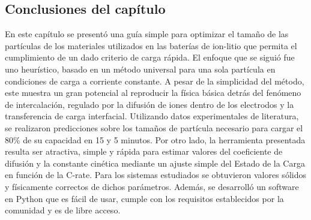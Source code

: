 \subsection{Conclusiones del capítulo}

En este capítulo se presentó una guía simple para optimizar el tamaño de las 
partículas de los materiales utilizados en las baterías de ion-litio que permita
el cumplimiento de un dado criterio de carga rápida. El enfoque que se siguió
fue uno heurístico, basado en un método universal para una sola partícula en
condiciones de carga a corriente constante. A pesar de la simplicidad del método, 
este muestra un gran potencial al reproducir la física básica detrás del 
fenómeno de intercalación, regulado por la difusión de iones dentro de los 
electrodos y la transferencia de carga interfacial. Utilizando datos 
experimentales de literatura, se realizaron predicciones sobre los tamaños de
partícula necesario para cargar el 80\% de su capacidad en 15 y 5 minutos. 
Por otro lado, la herramienta presentada resulta ser atractiva, simple y rápida 
para estimar valores del coeficiente de difusión y la constante cinética mediante
un ajuste simple del Estado de la Carga en función de la C-rate. Para los 
sistemas estudiados se obtuvieron valores sólidos y físicamente correctos de
dichos parámetros. Además, se desarrolló un software en Python que es fácil 
de usar, cumple con los requisitos establecidos por la comunidad y es de libre
acceso.
